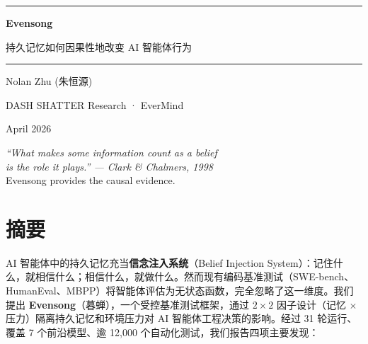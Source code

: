 \documentclass[11pt, a4paper]{article}
\begin{document}
\thispagestyle{empty}

\begin{center}
\vspace*{35mm}

{\color{deep}\rule{0.6\textwidth}{1pt}}

\vspace{8mm}

{\fontsize{28pt}{34pt}\selectfont\sffamily\bfseries\color{deep}%
Evensong}

\vspace{4mm}

{\fontsize{13pt}{18pt}\selectfont\sffamily\color{faded}%
持久记忆如何因果性地改变 AI 智能体行为}

\vspace{8mm}

{\color{deep}\rule{0.6\textwidth}{1pt}}

\vspace{14mm}

{\large\sffamily\color{deep!80} Nolan Zhu (朱恒源)}

\vspace{3mm}

{\sffamily\color{faded} DASH SHATTER Research · EverMind}

\vspace{3mm}

{\sffamily\color{faded} April 2026}

\vfill

{\small\sffamily\color{faded}%
\textit{``What makes some information count as a belief}\\
\textit{is the role it plays.'' --- Clark \& Chalmers, 1998}\\[4pt]
Evensong provides the causal evidence.}

\vspace{10mm}
\end{center}

\clearpage

\pagestyle{fancy}
\section*{摘要}

AI 智能体中的持久记忆充当\textbf{信念注入系统}（Belief Injection System）：记住什么，就相信什么；相信什么，就做什么。然而现有编码基准测试（SWE-bench、HumanEval、MBPP）将智能体评估为无状态函数，完全忽略了这一维度。我们提出 \textbf{Evensong}（暮蝉），一个受控基准测试框架，通过 $2 \times 2$ 因子设计（记忆 $\times$ 压力）隔离持久记忆和环境压力对 AI 智能体工程决策的影响。经过 31 轮运行、覆盖 7 个前沿模型、逾 12{,}000 个自动化测试，我们报告四项主要发现：
\end{document}
